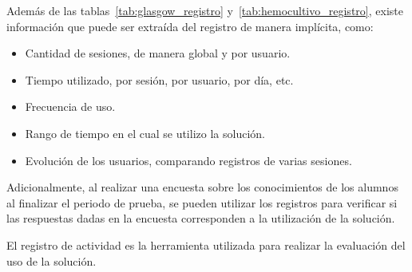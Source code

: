 Además de las tablas~\ref{tab:glasgow_registro}
y~\ref{tab:hemocultivo_registro}, existe información que puede ser extraída del
registro de manera implícita, como:

\begin{itemize}
\item Cantidad de sesiones, de manera global y por usuario.
\item Tiempo utilizado, por sesión, por usuario, por día, etc.
\item Frecuencia de uso.
\item Rango de tiempo en el cual se utilizo la solución.
\item Evolución de los usuarios, comparando registros de varias sesiones.
\end{itemize}

Adicionalmente, al realizar una encuesta sobre los conocimientos de los alumnos
al finalizar el periodo de prueba, se pueden utilizar los registros para
verificar si las respuestas dadas en la encuesta corresponden a la utilización
de la solución.

El registro de actividad es la herramienta utilizada para realizar la evaluación
del uso de la solución.
